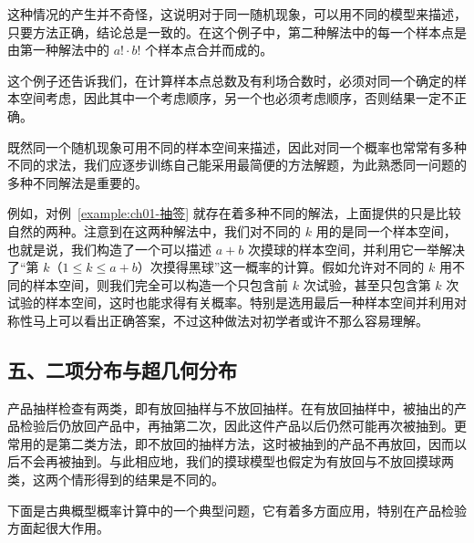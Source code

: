 \documentclass[../../main.tex]{subfiles}
\begin{document}
\begin{example}[抽签与顺序无关]
这种情况的产生并不奇怪，这说明对于同一随机现象，可以用不同的模型来描述，只要方法正确，结论总是一致的。在这个例子中，第二种解法中的每一个样本点是由第一种解法中的 $a!\cdot b!$ 个样本点合并而成的。

这个例子还告诉我们，在计算样本点总数及有利场合数时，必须对同一个确定的样本空间考虑，因此其中一个考虑顺序，另一个也必须考虑顺序，否则结果一定不正确。

既然同一个随机现象可用不同的样本空间来描述，因此对同一个概率也常常有多种不同的求法，我们应逐步训练自己能采用最简便的方法解题，为此熟悉同一问题的多种不同解法是重要的。

例如，对例~\ref{example:ch01-抽签} 就存在着多种不同的解法，上面提供的只是比较自然的两种。注意到在这两种解法中，我们对不同的 $k$ 用的是同一个样本空间，也就是说，我们构造了一个可以描述 $a+b$ 次摸球的样本空间，并利用它一举解决了“第 $k$（$1\leqslant k\leqslant a+b$）次摸得黑球”这一概率的计算。假如允许对不同的 $k$ 用不同的样本空间，则我们完全可以构造一个只包含前 $k$ 次试验，甚至只包含第 $k$ 次试验的样本空间，这时也能求得有关概率。特别是选用最后一种样本空间并利用对称性马上可以看出正确答案，不过这种做法对初学者或许不那么容易理解。
\end{example}

\subsection*{五、二项分布与超几何分布}

产品抽样检查有两类，即有放回抽样与不放回抽样。在有放回抽样中，被抽出的产品检验后仍放回产品中，再抽第二次，因此这件产品以后仍然可能再次被抽到。更常用的是第二类方法，即不放回的抽样方法，这时被抽到的产品不再放回，因而以后不会再被抽到。与此相应地，我们的摸球模型也假定为有放回与不放回摸球两类，这两个情形得到的结果是不同的。

下面是古典概型概率计算中的一个典型问题，它有着多方面应用，特别在产品检验方面起很大作用。
\end{document}
